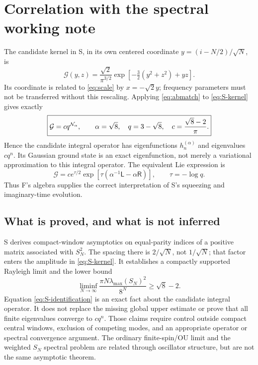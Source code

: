 \documentclass[11pt,reqno]{amsart}
\theoremstyle{remark}\newtheorem{remark}[proposition]{Remark}
\begin{document}
\section{Correlation with the spectral working note}\label{sec:spectral}
The candidate kernel in S, in its own centered coordinate
$y=(i-N/2)/\sqrt N$, is
\begin{equation}\label{eq:S-kernel}
 \mathcal G(y,z)=\frac{\sqrt2}{\pi^{3/2}}
 \exp[-\tfrac32(y^2+z^2)+yz].
\end{equation}
Its coordinate is related to \eqref{eq:scale} by $x=-\sqrt2y$;
frequency parameters must not be transferred without this rescaling.
Applying \eqref{eq:abmatch} to \eqref{eq:S-kernel} gives exactly
\begin{equation}\label{eq:S-identification}
 \boxed{\mathcal G=cq^{\mathcal N_\alpha},\qquad
 \alpha=\sqrt8,\quad q=3-\sqrt8,\quad
 c=\frac{\sqrt8-2}{\pi}.}
\end{equation}
Hence the candidate integral operator has eigenfunctions
$h_n^{(\alpha)}$ and eigenvalues $cq^n$. Its Gaussian ground state is
an exact eigenfunction, not merely a variational approximation to
this integral operator. The equivalent Lie expression is
\[
 \mathcal G=c e^{\tau/2}
 \exp[\tau(\alpha^{-1}\mathsf L-\alpha\mathsf R)],
 \qquad \tau=-\log q.
\]
Thus F's algebra supplies the correct interpretation of S's squeezing
and imaginary-time evolution.

\subsection{What is proved, and what is not inferred}
S derives compact-window asymptotics on equal-parity indices of a
positive matrix associated with $S_N^2$. The spacing there is
$2/\sqrt N$, not $1/\sqrt N$; that factor enters the amplitude in
\eqref{eq:S-kernel}. It establishes a compactly supported Rayleigh
limit and the lower bound
\begin{equation}\label{eq:lower}
 \liminf_{N\to\infty}\frac{\pi N\lambda_{\max}(S_N)^2}{8^N}
 \ge\sqrt8-2.
\end{equation}
Equation \eqref{eq:S-identification} is an exact fact about the candidate
integral operator. It does not replace the missing global upper estimate
or prove that all finite eigenvalues converge to $cq^n$. Those claims
require control outside compact central windows, exclusion of competing
modes, and an appropriate operator or spectral convergence argument.
The ordinary finite-spin/OU limit and the weighted $S_N$ spectral
problem are related through oscillator structure, but are not the same
asymptotic theorem.
\end{document}
